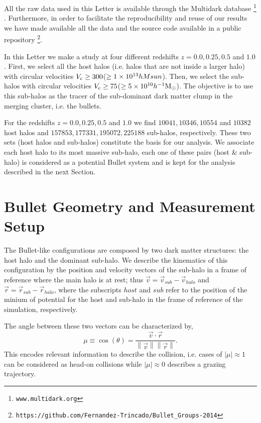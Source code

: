 \documentclass{emulateapj}
\newcommand{\hMsun}{{\ifmmode{h^{-1}{\rm {M_{\odot}}}}\else{$h^{-1}{\rm{M_{\odot}}}$}\fi}}
\newcommand{\kms}{{\ifmmode{{\mathrm{\,km\ s}^{-1}}}\else{\,km~s$^{-1}$}\fi}}
\begin{document}
All the raw data used in this Letter is available through the
Multidark database \footnote{\texttt{www.multidark.org}}
\citep{Riebe2013}.  Furthermore, in order to facilitate the
reproducibility and reuse of our results we have made available all
the data and the source code available in a public
repository \footnote{\texttt{https://github.com/Fernandez-Trincado/Bullet\_Groups-2014}}. 

In this Letter we make a study at four different redshifts $z=0.0,0.25,
0.5$ and $1.0$. First, we select all the host halos (i.e. halos that
are not inside a larger halo) with circular velocities $V_{\rm c}\geq
300$\kms ($\geq 1\times 10^{13}\\hMsun$). Then, we select the sub-halos with
circular velocities $V_{\rm c}\geq 75$\kms ($\geq 5\times
10^{10}\hMsun$). The objective is to use this sub-halos as the tracer
of the sub-dominant dark matter clump in the merging cluster, i.e. the
bullets. 

For the redshifts $z=0.0,0.25, 0.5$ and $1.0$ we find $10041, 10346,
10554$ and $10382$ host halos and $157853, 177331, 195072, 225188$
sub-halos, respectively. These two sets (host halos and sub-halos)
constitute the basis for our analysis. We associate each host halo
to its most massive sub-halo, each one of these pairs (host \& sub-halo)
is considered as a potential Bullet system and is kept for the
analysis described in the next Section. 

\section{Bullet Geometry and Measurement Setup}
\label{sec:setup}

The Bullet-like configurations are composed by two dark matter
structures: the host halo and the dominant sub-halo. We describe the
kinematics of this configuration by the 
position and velocity vectors of the sub-halo in a frame of reference
where the main halo is at rest; thus
$\vec{v{}}=\vec{v}_{sub}-\vec{v}_{halo}$ and
$\vec{r}=\vec{r}_{sub}-\vec{r}_{halo}$, where the subscripts $host$
and $sub$ refer to the position of the minium of potential for the
host and sub-halo in the frame of reference of the simulation,
respectively.  

The angle between these two vectors can be characterized by, 
\begin{equation}
  \mu\equiv
  \cos(\theta)=\frac{\vec{v{}}\cdotp{}\vec{r}}{\left\|\vec{v}{}\right\|
    \left\|\vec{r}\right\|} .
 \end{equation} 
%
This encodes relevant information to describe the collision,
i.e. cases of $|\mu|\approx 1$ can be considered as head-on collisions
while $|\mu|\approx 0$ describes a grazing trajectory.
\end{document}
